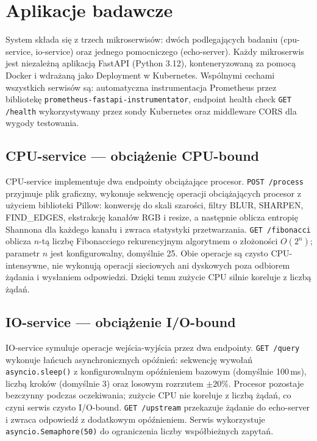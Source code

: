 \section{Aplikacje badawcze}

System składa się z trzech mikroserwisów: dwóch podlegających badaniu (cpu-service, io-service) oraz jednego pomocniczego (echo-server). Każdy mikroserwis jest niezależną aplikacją FastAPI (Python 3.12), konteneryzowaną za pomocą Docker i wdrażaną jako Deployment w Kubernetes. Wspólnymi cechami wszystkich serwisów są: automatyczna instrumentacja Prometheus przez bibliotekę \texttt{prometheus-fastapi-instrumentator}, endpoint health check \texttt{GET /health} wykorzystywany przez sondy Kubernetes oraz middleware CORS dla wygody testowania.

\subsection{CPU-service — obciążenie CPU-bound}

CPU-service implementuje dwa endpointy obciążające procesor. \texttt{POST /process} przyjmuje plik graficzny, wykonuje sekwencję operacji obciążających procesor z użyciem biblioteki Pillow: konwersję do skali szarości, filtry BLUR, SHARPEN, FIND\_EDGES, ekstrakcję kanałów RGB i resize, a następnie oblicza entropię Shannona dla każdego kanału i zwraca statystyki przetwarzania. \texttt{GET /fibonacci} oblicza $n$-tą liczbę Fibonacciego rekurencyjnym algorytmem o złożoności $O(2^{n})$; parametr $n$ jest konfigurowalny, domyślnie 25. Obie operacje są czysto CPU-intensywne, nie wykonują operacji sieciowych ani dyskowych poza odbiorem żądania i wysłaniem odpowiedzi. Dzięki temu zużycie CPU silnie koreluje z liczbą żądań.

\subsection{IO-service — obciążenie I/O-bound}

IO-service symuluje operacje wejścia-wyjścia przez dwa endpointy. \texttt{GET /query} wykonuje łańcuch asynchronicznych opóźnień: sekwencję wywołań \texttt{asyncio.sleep()} z konfigurowalnym opóźnieniem bazowym (domyślnie 100\,ms), liczbą kroków (domyślnie 3) oraz losowym rozrzutem $\pm20\%$. Procesor pozostaje bezczynny podczas oczekiwania; zużycie CPU nie koreluje z liczbą żądań, co czyni serwis czysto I/O-bound. \texttt{GET /upstream} przekazuje żądanie do echo-server i zwraca odpowiedź z dodatkowym opóźnieniem. Serwis wykorzystuje \texttt{asyncio.Semaphore(50)} do ograniczenia liczby współbieżnych zapytań.

